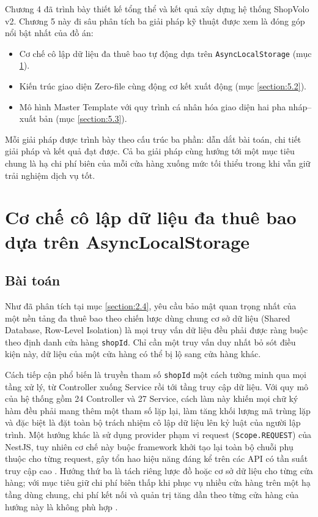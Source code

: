 \documentclass[../main.tex]{subfiles}
\begin{document}
Chương 4 đã trình bày thiết kế tổng thể và kết quả xây dựng hệ thống ShopVolo v2. Chương 5 này đi sâu phân tích ba giải pháp kỹ thuật được xem là đóng góp nổi bật nhất của đồ án:

\begin{itemize}
    \item Cơ chế cô lập dữ liệu đa thuê bao tự động dựa trên \texttt{AsyncLocalStorage} (mục \ref{section:5.1}).
    \item Kiến trúc giao diện Zero-file cùng động cơ kết xuất động (mục \ref{section:5.2}).
    \item Mô hình Master Template với quy trình cá nhân hóa giao diện hai pha nháp--xuất bản (mục \ref{section:5.3}).
\end{itemize}

Mỗi giải pháp được trình bày theo cấu trúc ba phần: dẫn dắt bài toán, chi tiết giải pháp và kết quả đạt được. Cả ba giải pháp cùng hướng tới một mục tiêu chung là hạ chi phí biên của mỗi cửa hàng xuống mức tối thiểu trong khi vẫn giữ trải nghiệm dịch vụ tốt.

\section{Cơ chế cô lập dữ liệu đa thuê bao dựa trên AsyncLocalStorage}
\label{section:5.1}

\subsection{Bài toán}
\label{subsection:5.1.1}

Như đã phân tích tại mục \ref{section:2.4}, yêu cầu bảo mật quan trọng nhất của một nền tảng đa thuê bao theo chiến lược dùng chung cơ sở dữ liệu (Shared Database, Row-Level Isolation) là mọi truy vấn dữ liệu đều phải được ràng buộc theo định danh cửa hàng \texttt{shopId}. Chỉ cần một truy vấn duy nhất bỏ sót điều kiện này, dữ liệu của một cửa hàng có thể bị lộ sang cửa hàng khác.

Cách tiếp cận phổ biến là truyền tham số \texttt{shopId} một cách tường minh qua mọi tầng xử lý, từ Controller xuống Service rồi tới tầng truy cập dữ liệu. Với quy mô của hệ thống gồm 24 Controller và 27 Service, cách làm này khiến mọi chữ ký hàm đều phải mang thêm một tham số lặp lại, làm tăng khối lượng mã trùng lặp và đặc biệt là đặt toàn bộ trách nhiệm cô lập dữ liệu lên kỷ luật của người lập trình. Một hướng khác là sử dụng provider phạm vi request (\texttt{Scope.REQUEST}) của NestJS, tuy nhiên cơ chế này buộc framework khởi tạo lại toàn bộ chuỗi phụ thuộc cho từng request, gây tổn hao hiệu năng đáng kể trên các API có tần suất truy cập cao \cite{nestjs_docs}. Hướng thứ ba là tách riêng lược đồ hoặc cơ sở dữ liệu cho từng cửa hàng; với mục tiêu giữ chi phí biên thấp khi phục vụ nhiều cửa hàng trên một hạ tầng dùng chung, chi phí kết nối và quản trị tăng dần theo từng cửa hàng của hướng này là không phù hợp \cite{bezemer2010multi}.
\end{document}
